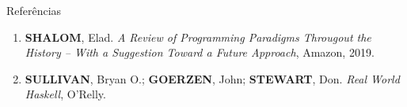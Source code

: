 \begin{frame}[fragile]{Referências}

    \begin{enumerate}
        \item \textbf{SHALOM}, Elad. \textit{A Review of Programming Paradigms Througout the 
            History -- With a Suggestion Toward a Future Approach}, Amazon, 2019.

        \item \textbf{SULLIVAN}, Bryan O.; \textbf{GOERZEN}, John; \textbf{STEWART}, Don. 
            \textit{Real World Haskell}, O'Relly.

    \end{enumerate}

\end{frame}

